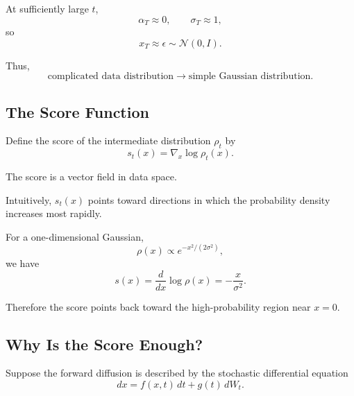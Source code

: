 At sufficiently large $t$,
\begin{equation}
    \alpha_T\approx0,
    \qquad
    \sigma_T\approx1,
\end{equation}
so
\begin{equation}
    x_T\approx\epsilon
    \sim\mathcal N(0,I).
\end{equation}

Thus,
\begin{equation}
    \boxed{
    \text{complicated data distribution}
    \rightarrow
    \text{simple Gaussian distribution}.
    }
\end{equation}


\subsection{The Score Function}

Define the score of the intermediate distribution $\rho_t$ by
\begin{equation}
    \boxed{
    s_t(x)
    =
    \nabla_x
    \log \rho_t(x).
    }
\end{equation}

The score is a vector field in data space.

Intuitively, $s_t(x)$ points toward directions in which the probability density
increases most rapidly.

For a one-dimensional Gaussian,
\begin{equation}
    \rho(x)
    \propto
    e^{-x^2/(2\sigma^2)},
\end{equation}
we have
\begin{equation}
    s(x)
    =
    \frac{d}{dx}\log\rho(x)
    =
    -\frac{x}{\sigma^2}.
\end{equation}

Therefore the score points back toward the high-probability region near
$x=0$.


\subsection{Why Is the Score Enough?}

Suppose the forward diffusion is described by the stochastic differential
equation
\begin{equation}
    dx
    =
    f(x,t)\,dt
    +
    g(t)\,dW_t.
\end{equation}

